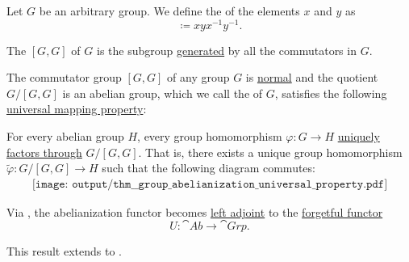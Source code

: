 \begin{definition}\label{def:group_commutator}
  Let \( G \) be an arbitrary group. We define the  of the elements \( x \) and \( y \) as
  \begin{equation*}
    [x, y] \coloneqq xyx^{-1}y^{-1}.
  \end{equation*}

  The  \( [G, G] \) of \( G \) is the subgroup \hyperref[def:group/submodel]{generated} by all the commutators in \( G \).
\end{definition}

\begin{proposition}\label{thm:group_abelianization_universal_property}
  The commutator group \( [G, G] \) of any group \( G \) is \hyperref[thm:normal_subgroup_equivalences]{normal} and the quotient \( G / [G, G] \) is an abelian group, which we call the  of \( G \), satisfies the following \hyperref[rem:universal_mapping_property]{universal mapping property}:
  \begin{displayquote}
    For every abelian group \( H \), every group homomorphism \( \varphi: G \to H \) \hyperref[def:factors_through]{uniquely factors through} \( G / [G, G] \). That is, there exists a unique group homomorphism \( \widetilde{\varphi}: G / [G, G] \to H \) such that the following diagram commutes:
    \begin{equation}\label{eq:thm:group_abelianization_universal_property/diagram}
      \begin{aligned}
        \texttt{[image: output/thm\_\_group\_abelianization\_universal\_property.pdf]}
      \end{aligned}
    \end{equation}
  \end{displayquote}

  Via , the abelianization functor becomes \hyperref[def:category_adjunction]{left adjoint} to the \hyperref[def:concrete_category]{forgetful functor}
  \begin{equation*}
    U: \cat{Ab} \to \cat{Grp}.
  \end{equation*}

  This result extends to .
\end{proposition}

